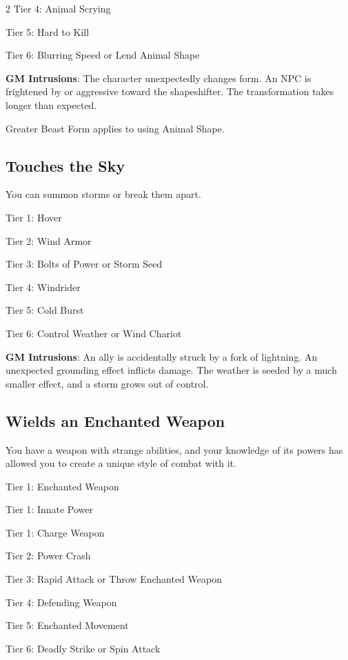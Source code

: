 \begin{multicols}{2}
Tier 4: Animal Scrying

Tier 5: Hard to Kill

Tier 6: Blurring Speed or Lend Animal Shape

\textbf{GM Intrusions}: The character unexpectedly changes form. An NPC is frightened by or aggressive toward the shapeshifter. The transformation takes longer than expected.

Greater Beast Form applies to using Animal Shape.

\subsection{Touches the Sky} 

You can summon storms or break them apart.

Tier 1: Hover 

Tier 2: Wind Armor 

Tier 3: Bolts of Power or Storm Seed

Tier 4: Windrider 

Tier 5: Cold Burst 

Tier 6: Control Weather or Wind Chariot 

\textbf{GM Intrusions}: An ally is accidentally struck by a fork of lightning. An unexpected grounding effect inflicts damage. The weather is seeded by a much smaller effect, and a storm grows out of control.

\subsection{Wields an Enchanted Weapon} 

You have a weapon with strange abilities, and your knowledge of its powers has allowed you to create a unique style of combat with it.

Tier 1: Enchanted Weapon

Tier 1: Innate Power

Tier 1: Charge Weapon

Tier 2: Power Crash

Tier 3: Rapid Attack or Throw Enchanted Weapon

Tier 4: Defending Weapon

Tier 5: Enchanted Movement

Tier 6: Deadly Strike or Spin Attack 


\end{multicols}
